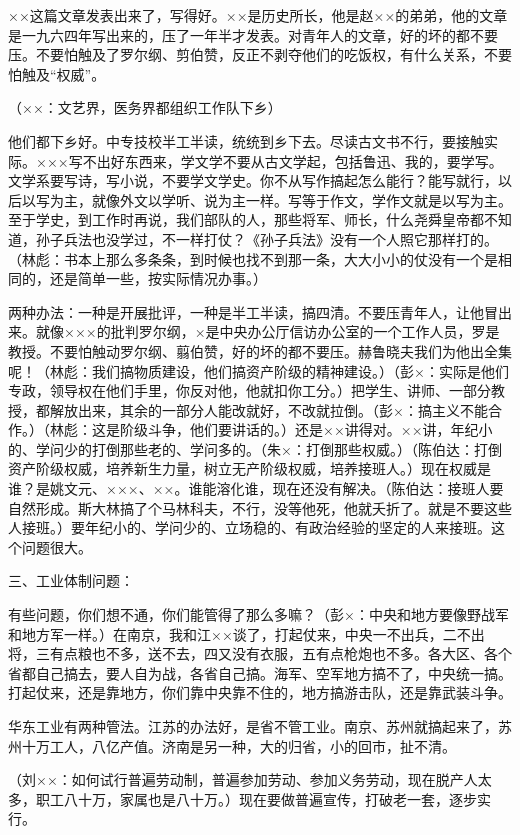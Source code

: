 ××这篇文章发表出来了，写得好。××是历史所长，他是赵××的弟弟，他的文章是一九六四年写出来的，压了一年半才发表。对青年人的文章，好的坏的都不要压。不要怕触及了罗尔纲、剪伯赞，反正不剥夺他们的吃饭权，有什么关系，不要怕触及“权威”。

（××：文艺界，医务界都组织工作队下乡）

他们都下乡好。中专技校半工半读，统统到乡下去。尽读古文书不行，要接触实际。×××写不出好东西来，学文学不要从古文学起，包括鲁迅、我的，要学写。文学系要写诗，写小说，不要学文学史。你不从写作搞起怎么能行？能写就行，以后以写为主，就像外文以学听、说为主一样。写等于作文，学作文就是以写为主。至于学史，到工作时再说，我们部队的人，那些将军、师长，什么尧舜皇帝都不知道，孙子兵法也没学过，不一样打仗？《孙子兵法》没有一个人照它那样打的。（林彪：书本上那么多条条，到时候也找不到那一条，大大小小的仗没有一个是相同的，还是简单一些，按实际情况办事。）

两种办法：一种是开展批评，一种是半工半读，搞四清。不要压青年人，让他冒出来。就像×××的批判罗尔纲，×是中央办公厅信访办公室的一个工作人员，罗是教授。不要怕触动罗尔纲、翦伯赞，好的坏的都不要压。赫鲁晓夫我们为他出全集呢！（林彪：我们搞物质建设，他们搞资产阶级的精神建设。）（彭×：实际是他们专政，领导权在他们手里，你反对他，他就扣你工分。）把学生、讲师、一部分教授，都解放出来，其余的一部分人能改就好，不改就拉倒。（彭×：搞主义不能合作。）（林彪：这是阶级斗争，他们要讲话的。）还是××讲得对。××讲，年纪小的、学问少的打倒那些老的、学问多的。（朱×：打倒那些权威。）（陈伯达：打倒资产阶级权威，培养新生力量，树立无产阶级权威，培养接班人。）现在权威是谁？是姚文元、×××、××。谁能溶化谁，现在还没有解决。（陈伯达：接班人要自然形成。斯大林搞了个马林科夫，不行，没等他死，他就夭折了。就是不要这些人接班。）要年纪小的、学问少的、立场稳的、有政治经验的坚定的人来接班。这个问题很大。

三、工业体制问题：

有些问题，你们想不通，你们能管得了那么多嘛？（彭×：中央和地方要像野战军和地方军一样。）在南京，我和江××谈了，打起仗来，中央一不出兵，二不出将，三有点粮也不多，送不去，四又没有衣服，五有点枪炮也不多。各大区、各个省都自己搞去，要人自为战，各省自己搞。海军、空军地方搞不了，中央统一搞。打起仗来，还是靠地方，你们靠中央靠不住的，地方搞游击队，还是靠武装斗争。

华东工业有两种管法。江苏的办法好，是省不管工业。南京、苏州就搞起来了，苏州十万工人，八亿产值。济南是另一种，大的归省，小的回市，扯不清。

（刘××：如何试行普遍劳动制，普遍参加劳动、参加义务劳动，现在脱产人太多，职工八十万，家属也是八十万。）现在要做普遍宣传，打破老一套，逐步实行。

